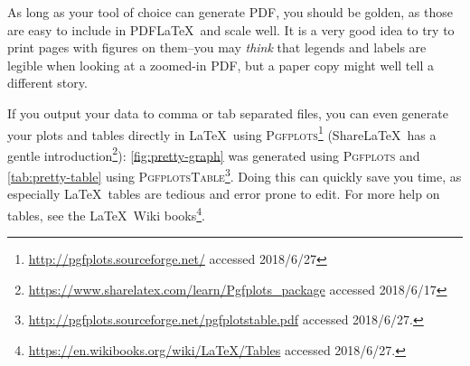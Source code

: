 As long as your tool of choice can generate \acs{PDF}, you should be golden,
as those are easy to include in PDF\LaTeX\ and scale well. It is a very good
idea to try to print pages with figures on them--you may \emph{think} that
legends and labels are legible when looking at a zoomed-in \acs{PDF}, but a
paper copy might well tell a different story.

If you output your data to comma or tab separated files, you can even
generate your plots and tables directly in \LaTeX\ using
\textsc{Pgfplots}\footnote{\url{http://pgfplots.sourceforge.net/} accessed
  2018/6/27} (Share\LaTeX\ has a gentle
introduction\footnote{\url{https://www.sharelatex.com/learn/Pgfplots_package}
  accessed 2018/6/17}): \autoref{fig:pretty-graph} was generated using
\textsc{Pgfplots} and \autoref{tab:pretty-table} using
\textsc{PgfplotsTable}\footnote{\url{http://pgfplots.sourceforge.net/pgfplotstable.pdf}
  accessed 2018/6/27.}.  Doing this can quickly save you time, as especially
\LaTeX\ tables are tedious and error prone to edit. For more help on tables,
see the \LaTeX\ Wiki
books\footnote{\url{https://en.wikibooks.org/wiki/LaTeX/Tables} accessed
  2018/6/27.}.


